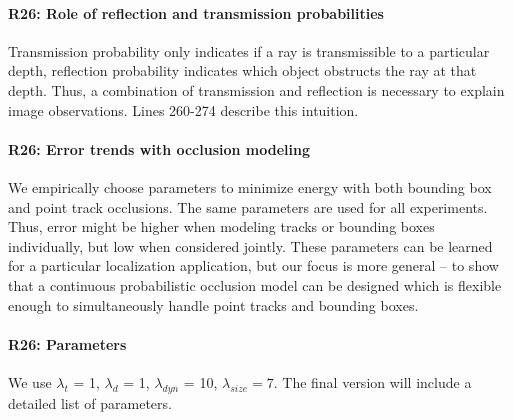 \documentclass[10pt,twocolumn,letterpaper]{article}
\newcommand{\hili}[1]{\colorbox{yellow}{#1}}
\begin{document}
\vspace{-0.4cm}
\paragraph{R26: Role of reflection and transmission probabilities}
Transmission probability only indicates if a ray is transmissible to a particular depth, reflection probability indicates which object obstructs the ray at that depth. Thus, a combination of transmission and reflection is necessary to explain image observations. Lines 260-274 describe this intuition.


\vspace{-0.4cm}
\paragraph{R26: Error trends with occlusion modeling}
We empirically choose parameters to minimize energy with both bounding box and point track occlusions. The same parameters are used for all experiments. Thus, error might be higher when modeling tracks or bounding boxes individually, but low when considered jointly. These parameters can be learned for a particular localization application, but our focus is more general -- to show that a continuous probabilistic occlusion model can be designed which is flexible enough to simultaneously handle point tracks and bounding boxes.

\vspace{-0.4cm}
\paragraph{R26: Parameters}
We use $\lambda_{t}$ = 1, $\lambda_{d}$ = 1, $\lambda_{dyn}$ = 10, $\lambda_{size} = 7$. The final version will include a detailed list of parameters.



\end{document}
